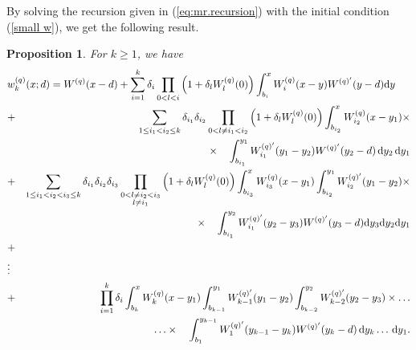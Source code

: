 \documentclass[12pt,reqno]{amsart}
\newcommand{\red}{\textcolor[rgb]{1.00,0.00,0.00}}
\newcommand{\blue}{\textcolor[rgb]{0.00,0.00,1.00}}
\newtheorem{prop}[theorem]{Proposition}
\theoremstyle{definition}
\theoremstyle{remark}
\newcommand{\md}{\mathrm{d}}
\begin{document}
By solving the recursion given in (\ref{eq:mr.recursion}) with the initial condition (\ref{small w}), we get the following result.

\begin{prop}
For $k\geq 1$, we have
\begin{eqnarray}\label{w_n_explicit}\nonumber
 \lefteqn{w_k^{(q)}(x;d)=W^{(q)}(x-d) + \sum_{i=1}^k \delta_i \prod_{0<l<i} \left(1+\delta_l W_l^{\left(q\right)}(0)\right) 
 \int^{x}_{b_{i}}W_i^{\left(q\right)}(x-y)W^{\left(q\right)'}(y-d)\md y} \\\nonumber &  +  &
\sum_{1\leq i_1 <i_2 \leq k} \delta_{i_1} \delta_{i_2} \prod_{0<l\neq i_1<i_2} \left(1+\delta_l  W_l^{\left(q\right)}(0)\right) 
 \int^{x}_{b_{i_2}}W_{i_2}^{\left(q\right)}(x-y_1) \times \\\nonumber  & & \times \quad
\int^{y_1}_{b_{i_1}}W_{i_1}^{\left(q\right)'}(y_1-y_2)W^{\left(q\right)'}(y_2-d)\,\md y_2\, \md y_1
\\
\nonumber &  + &
\sum_{1\leq i_1<i_2<i_3 \leq k} \delta_{i_1} \delta_{i_2} \delta_{i_3} \prod_{\substack{0<l\neq i_2<i_3 \\ l\neq i_1}} 
\left(1+\delta_l  W_l^{\left(q\right)}(0)\right)  \int^{x}_{b_{i_3}}W_{i_3}^{\left(q\right)}(x-y_1)\int^{y_1}_{b_{i_2}}
W_{i_2}^{\left(q\right)'}(y_1-y_2) \times \\\nonumber   & & \times \quad \int^{y_2}_{b_{i_1}} W_{i_1}^{\left(q\right)'}(y_2-y_3)
W^{\left(q\right)'}(y_3-d)\md y_3 \md y_2 \md y_1 \\\nonumber & + &\\\nonumber &   \vdots \\\nonumber &  + &
\prod_{i=1}^k \delta_i   \int^{x}_{b_{k}}W_k^{\left(q\right)}(x-y_1)\int^{y_1}_{b_{k-1}}W_{k-1}^{\left(q\right)'}(y_1-y_2)
  \int^{y_2}_{b_{k-2}} W_{k-2}^{\left(q\right)'}(y_2-y_3) \times \ldots \\   & & \ldots \times \quad 
	\int^{y_{k-1}}_{b_{1}}W_1^{\left(q\right)'}(y_{k-1}-y_{k})W^{\left(q\right)'}(y_k-d)\,\md y_k\ldots\, \md y_1.
\end{eqnarray}
\end{prop}
\end{document}
